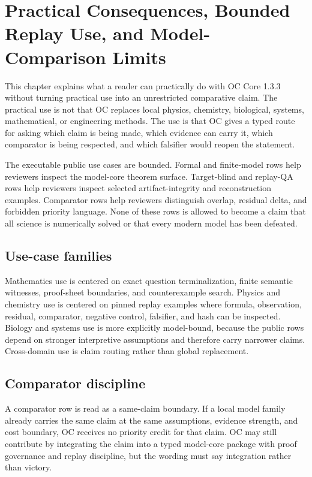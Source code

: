 \section{Practical Consequences, Bounded Replay Use, and Model-Comparison Limits}

\label{sec:oc-core-1-3-practical-utility}

This chapter explains what a reader can practically do with OC Core 1.3.3 without turning practical use into an unrestricted comparative claim. The practical use is not that OC replaces local physics, chemistry, biological, systems, mathematical, or engineering methods. The use is that OC gives a typed route for asking which claim is being made, which evidence can carry it, which comparator is being respected, and which falsifier would reopen the statement.


The executable public use cases are bounded. Formal and finite-model rows help reviewers inspect the model-core theorem surface. Target-blind and replay-QA rows help reviewers inspect selected artifact-integrity and reconstruction examples. Comparator rows help reviewers distinguish overlap, residual delta, and forbidden priority language. None of these rows is allowed to become a claim that all science is numerically solved or that every modern model has been defeated.


\subsection{Use-case families}

Mathematics use is centered on exact question terminalization, finite semantic witnesses, proof-sheet boundaries, and counterexample search. Physics and chemistry use is centered on pinned replay examples where formula, observation, residual, comparator, negative control, falsifier, and hash can be inspected. Biology and systems use is more explicitly model-bound, because the public rows depend on stronger interpretive assumptions and therefore carry narrower claims. Cross-domain use is claim routing rather than global replacement.


\subsection{Comparator discipline}

A comparator row is read as a same-claim boundary. If a local model family already carries the same claim at the same assumptions, evidence strength, and cost boundary, OC receives no priority credit for that claim. OC may still contribute by integrating the claim into a typed model-core package with proof governance and replay discipline, but the wording must say integration rather than victory.


